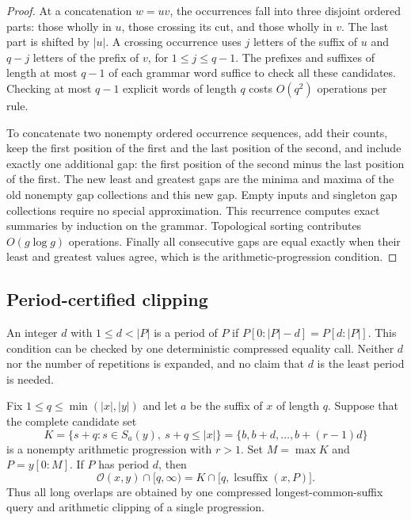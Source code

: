 \begin{proof}
At a concatenation $w=uv$, the occurrences fall into three disjoint ordered
parts: those wholly in $u$, those crossing its cut, and those wholly in $v$.
The last part is shifted by $|u|$.  A crossing occurrence uses $j$ letters
of the suffix of $u$ and $q-j$ letters of the prefix of $v$, for
$1\leq j\leq q-1$.  The prefixes and suffixes of length at most $q-1$ of
each grammar word suffice to check all these candidates.  Checking at most
$q-1$ explicit words of length $q$ costs $O(q^2)$ operations per rule.

To concatenate two nonempty ordered occurrence sequences, add their counts,
keep the first position of the first and the last position of the second,
and include exactly one additional gap: the first position of the second
minus the last position of the first.  The new least and greatest gaps are
the minima and maxima of the old nonempty gap collections and this new gap.
Empty inputs and singleton gap collections require no special approximation.
This recurrence computes exact summaries by induction on the grammar.
Topological sorting contributes $O(g\log g)$ operations.  Finally all
consecutive gaps are equal exactly when their least and greatest values
agree, which is the arithmetic-progression condition.
\end{proof}

\subsection{Period-certified clipping}

An integer $d$ with $1\leq d<|P|$ is a period of $P$ if
$P[0:|P|-d]=P[d:|P|]$.  This condition can be checked by one deterministic
compressed equality call.  Neither $d$ nor the number of repetitions is
expanded, and no claim that $d$ is the least period is needed.

\begin{theorem}
Fix $1\leq q\leq\min(|x|,|y|)$ and let $a$ be the suffix of $x$ of length
$q$.  Suppose that the complete candidate set
\[
 K=\{s+q:s\in S_a(y),\ s+q\leq |x|\}
   =\{b,b+d,\ldots,b+(r-1)d\}
\]
is a nonempty arithmetic progression with $r>1$.
Set $M=\max K$ and $P=y[0:M]$.  If $P$ has period $d$, then
\[
 \mathcal O(x,y)\cap[q,\infty)
  =K\cap\bigl[q,\operatorname{lcsuffix}(x,P)\bigr].
\]
Thus all long overlaps are obtained by one compressed longest-common-suffix
query and arithmetic clipping of a single progression.
\end{theorem}

